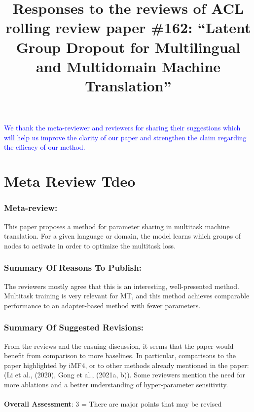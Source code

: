 \documentclass[12pt,times,a4paper,twoside]{article}
\title{Responses to the reviews of ACL rolling review paper \#162:
  ``Latent Group Dropout for Multilingual and Multidomain Machine Translation''
}
\author{}
\date{}
\theoremstyle{definition}
\begin{document}
\maketitle

\textcolor{blue}{We thank the meta-reviewer and reviewers for sharing their suggestions which will help us improve the clarity of our paper and strengthen the claim regarding the efficacy of our method.}

\section*{Meta Review Tdeo}

\subsubsection*{Meta-review:}

This paper proposes a method for parameter sharing in multitask machine translation. For a given language or domain, the model learns which groups of nodes to activate in order to optimize the multitask loss.

\subsubsection*{Summary Of Reasons To Publish:}

The reviewers mostly agree that this is an interesting, well-presented method. Multitask training is very relevant for MT, and this method achieves comparable performance to an adapter-based method with fewer parameters.

\subsubsection*{Summary Of Suggested Revisions:}

From the reviews and the ensuing discussion, it seems that the paper would benefit from comparison to more baselines. In particular, comparisons to the paper highlighted by iMF4, or to other methods already mentioned in the paper: (Li et al., (2020), Gong et al., (2021a, b)). Some reviewers mention the need for more ablations and a better understanding of hyper-parameter sensitivity.

\paragraph{}\textbf{Overall Assessment}: 3 = There are major points that may be revised
\end{document}
